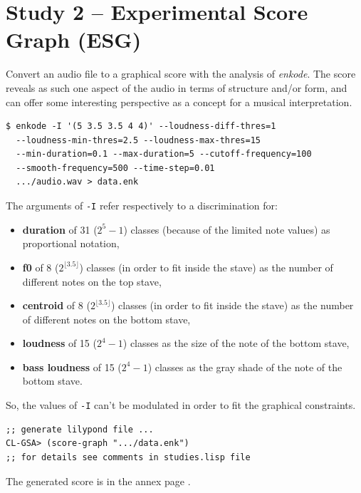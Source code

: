 \bigskip

\section*{Study 2 -- Experimental Score Graph (ESG)}


Convert an audio file to a graphical score with the analysis of \textsl{enkode}. The score reveals as such one aspect of the audio in terms of structure and/or form, and can offer some interesting perspective as a concept for a musical interpretation.

\bigskip

\begin{lstlisting}
$ enkode -I '(5 3.5 3.5 4 4)' --loudness-diff-thres=1 
  --loudness-min-thres=2.5 --loudness-max-thres=15 
  --min-duration=0.1 --max-duration=5 --cutoff-frequency=100 
  --smooth-frequency=500 --time-step=0.01 
  .../audio.wav > data.enk
\end{lstlisting}

The arguments of \texttt{-I} refer respectively to a discrimination for:

\begin{itemize}
\item \textbf{duration} of 31 ($2^5 -1$) classes (because of the limited note values) as proportional notation, 
\item \textbf{f0} of 8 ($2^{\lfloor 3.5 \rfloor}$) classes (in order to fit inside the stave) as the number of different notes on the top stave,
\item \textbf{centroid} of 8 ($2^{\lfloor 3.5 \rfloor}$) classes (in order to fit inside the stave) as the number of different notes on the bottom stave,
\item \textbf{loudness} of 15 ($2^4 -1$) classes as the size of the note of the bottom stave,
\item \textbf{bass loudness} of 15 ($2^4 -1$) classes as the gray shade of the note of the bottom stave.
\end{itemize}
 
 \noindent
\begin{info}
\begin{minipage}{0.95\textwidth}
\vspace{0.2cm}
 So, the values of \texttt{-I} can't be modulated in order to fit the graphical constraints.
\vspace{0.2cm}
\end{minipage}
\end{info}

\begin{lstlisting}
;; generate lilypond file ...
CL-GSA> (score-graph ".../data.enk")
;; for details see comments in studies.lisp file
\end{lstlisting}

\noindent The generated score is in the annex page \pageref{esg}.


